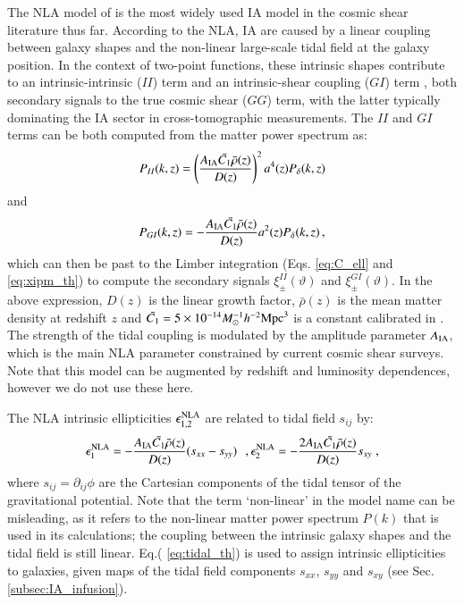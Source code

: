 \documentclass[useAMS,usenatbib]{mn2e}
\begin{document}
 
The NLA model of \citet{NLA} is the most widely used IA model in the cosmic shear literature thus far. According to the NLA, IA are caused by a linear coupling between galaxy shapes and the non-linear large-scale tidal field at the galaxy position. In the context of  two-point functions, these intrinsic shapes contribute to an intrinsic-intrinsic ($II$) term and an intrinsic-shear coupling ($GI$) term \citep{Hirata2004}, both secondary signals to the true cosmic shear ($GG$) term, with the latter typically dominating the IA sector in cross-tomographic measurements.  The $II$ and $GI$ terms  can be both computed from the matter power spectrum as: 
 \begin{eqnarray}
P_{II}(k,z) =  \left(\frac{A_{\rm IA}\bar{C_1}\bar{\rho}(z)}{D(z)}\right)^2a^4(z) P_{\delta}(k,z)
\label{eq:Pk_II_th}
\end{eqnarray}
and
 \begin{eqnarray}
P_{GI}(k,z) = - \frac{A_{\rm IA}\bar{C_1}\bar{\rho}(z)}{D(z)}a^2(z) P_{\delta}(k,z) \, ,
\label{eq:Pk_GI_th}
\end{eqnarray}
which can then be past to the Limber integration (Eqs. \ref{eq:C_ell} and \ref{eq:xipm_th}) to compute  the secondary signals $\xi_{\pm}^{II}(\vartheta)$ and $\xi_{\pm}^{GI}(\vartheta)$. 
In the above expression,  $D(z)$ is the linear growth factor, $\bar{\rho}(z)$ is the mean matter density at redshift $z$ and $\bar{C_1}=5\times 10^{-14} M_{\odot}^{-1} h^{-2} {\rm Mpc}^3$ is a constant calibrated in \citet{Brown2002}. 
The strength of the tidal coupling is modulated by the amplitude parameter $A_{\rm IA}$, which is the main NLA parameter constrained by current cosmic shear surveys. Note that this model can be augmented by redshift and luminosity dependences, however we do not use these here. 


The NLA intrinsic ellipticities $\epsilon_{1,2}^{\rm NLA}$ are related to tidal field $s_{ij}$ by:
 \begin{eqnarray}
\epsilon_1^{\rm NLA} = - \frac{A_{\rm IA}\bar{C_1}\bar{\rho}(z)}{D(z)} (s_{xx} - s_{yy}) \,\,\,\,,   \epsilon_2^{\rm NLA} = - \frac{2 A_{\rm IA}\bar{C_1}\bar{\rho}(z)}{D(z)} s_{xy}\;,
\label{eq:tidal_th}
\end{eqnarray}
where $s_{ij} = \partial_{ij}\phi$ are the Cartesian components of the tidal tensor of the gravitational potential. Note that the term `non-linear' in the model name can be  misleading, as it refers to the non-linear matter power spectrum $P(k)$ that is used in its calculations; the coupling between the intrinsic galaxy shapes and the tidal field is still linear.   Eq.( \ref{eq:tidal_th}) is used to assign intrinsic ellipticities to galaxies, given maps of the tidal field components $s_{xx}$, $s_{yy}$ and $s_{xy}$ (see Sec. \ref {subsec:IA_infusion}).
\end{document}

